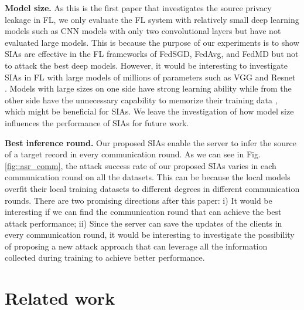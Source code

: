 \documentclass[10pt,journal,compsoc]{IEEEtran}
\begin{document}
\noindent \textbf{Model size.} As this is the first paper that investigates the source privacy leakage in FL, we only evaluate the FL system with relatively small deep learning models such as CNN models with only two convolutional layers but have not evaluated large models. This is because the purpose of our experiments is to show SIAs are effective in the FL frameworks of FedSGD, FedAvg, and FedMD but not to attack the best deep models. However, it would be interesting to investigate SIAs in FL with large models of millions of parameters such as VGG \cite{simonyan2014very} and Resnet \cite{he2016deep}. Models with large sizes on one side have strong learning ability while from the other side have the unnecessary capability to memorize their training data \cite{carlini2021extracting}, which might be beneficial for SIAs. We leave the investigation of how model size influences the performance of SIAs for future work.

\noindent \textbf{Best inference round. \;} Our proposed SIAs enable the server to infer the source of a target record in every communication round. As we can see in Fig. \ref{fig::asr_comm}, the attack success rate of our proposed SIAs varies in each communication round on all the datasets. This can be because the local models overfit their local training datasets to different degrees in different communication rounds. There are two promising directions after this paper: i) It would be interesting if we can find the communication round that can achieve the best attack performance; ii) Since the server can save the updates of the clients in every communication round, it would be interesting to investigate the possibility of proposing a new attack approach that can leverage all the information collected during training to achieve better performance.

\section{Related work}\label{sec::06}
\end{document}
